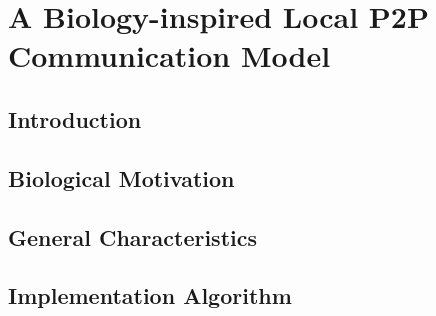 \chapter{A Biology-inspired Local P2P Communication Model}
\section{Introduction}

\section{Biological Motivation}

\section{General Characteristics}

\section{Implementation Algorithm}

